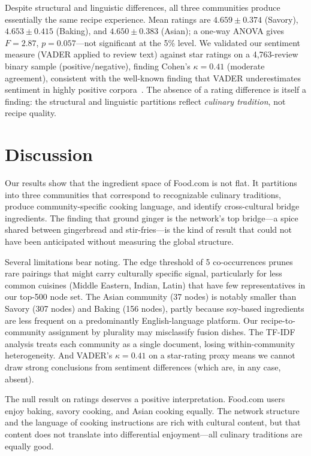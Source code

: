 \documentclass[9pt,twocolumn]{pnas-new}
\begin{document}
Despite structural and linguistic differences, all three communities produce essentially the same recipe experience. Mean ratings are $4.659 \pm 0.374$ (Savory), $4.653 \pm 0.415$ (Baking), and $4.650 \pm 0.383$ (Asian); a one-way ANOVA gives $F = 2.87$, $p = 0.057$---not significant at the 5\% level. We validated our sentiment measure (VADER applied to review text) against star ratings on a 4,763-review binary sample (positive/negative), finding Cohen's $\kappa = 0.41$ (moderate agreement), consistent with the well-known finding that VADER underestimates sentiment in highly positive corpora~\cite{hutto2014vader}. The absence of a rating difference is itself a finding: the structural and linguistic partitions reflect \textit{culinary tradition}, not recipe quality.

\section*{Discussion}

Our results show that the ingredient space of Food.com is not flat. It partitions into three communities that correspond to recognizable culinary traditions, produce community-specific cooking language, and identify cross-cultural bridge ingredients. The finding that ground ginger is the network's top bridge---a spice shared between gingerbread and stir-fries---is the kind of result that could not have been anticipated without measuring the global structure.

Several limitations bear noting. The edge threshold of 5 co-occurrences prunes rare pairings that might carry culturally specific signal, particularly for less common cuisines (Middle Eastern, Indian, Latin) that have few representatives in our top-500 node set. The Asian community (37 nodes) is notably smaller than Savory (307 nodes) and Baking (156 nodes), partly because soy-based ingredients are less frequent on a predominantly English-language platform. Our recipe-to-community assignment by plurality may misclassify fusion dishes. The TF-IDF analysis treats each community as a single document, losing within-community heterogeneity. And VADER's $\kappa = 0.41$ on a star-rating proxy means we cannot draw strong conclusions from sentiment differences (which are, in any case, absent).

The null result on ratings deserves a positive interpretation. Food.com users enjoy baking, savory cooking, and Asian cooking equally. The network structure and the language of cooking instructions are rich with cultural content, but that content does not translate into differential enjoyment---all culinary traditions are equally good.
\end{document}
